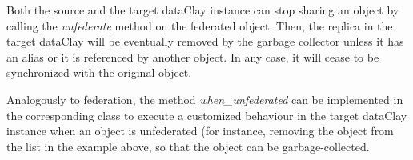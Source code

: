 Both the source and the target dataClay instance can stop sharing an object by calling the \textit{unfederate} method on the federated object. Then, the replica in the target dataClay will be eventually removed by the garbage collector unless it has an alias or it is referenced by another object. In any case, it will cease to be synchronized with the original object. 

Analogously to federation, the method \textit{when\_unfederated} can be implemented in the corresponding class to execute a customized behaviour in the target dataClay instance when an object is unfederated (for instance, removing the object from the list in the example above, so that the object can be garbage-collected.

\FEDERATION{

}